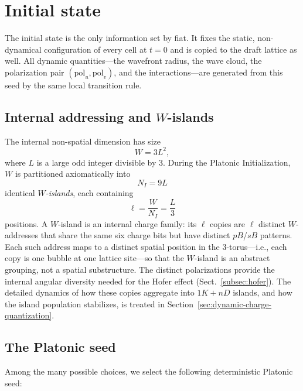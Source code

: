 \documentclass{ijuc}
\begin{document}

\section{Initial state}\label{initial-state}

The initial state is the only information set by fiat.  It fixes the static, non-dynamical configuration of every cell at $t=0$ and is copied to the draft lattice as well.  All dynamic quantities---the wavefront radius, the wave cloud, the polarization pair $(\mathrm{pol}_u,\mathrm{pol}_v)$, and the interactions---are generated from this seed by the same local transition rule.

\subsection{Internal addressing and $W$-islands}\label{subsec:w-islands}

The internal non-spatial dimension has size
\begin{equation}
W=3L^{2},
\end{equation}
where $L$ is a large odd integer divisible by $3$.
During the Platonic Initialization, $W$ is partitioned axiomatically into
\begin{equation}
N_{I}=9L
\end{equation}
identical \emph{$W$-islands}, each containing
\begin{equation}
\ell=\frac{W}{N_{I}}=\frac{L}{3}
\end{equation}
positions.
A $W$-island is an internal charge family: its $\ell$ copies are $\ell$ distinct $W$-addresses that share the same six charge bits but have distinct $pB$/$sB$ patterns.  Each such address maps to a distinct spatial position in the 3-torus---i.e., each copy is one bubble at one lattice site---so that the $W$-island is an abstract grouping, not a spatial substructure.
The distinct polarizations provide the internal angular diversity needed for the Hofer effect (Sect.~\ref{subsec:hofer}).
The detailed dynamics of how these copies aggregate into $1K+nD$ islands, and how the island population stabilizes, is treated in Section~\ref{sec:dynamic-charge-quantization}.

\subsection{The Platonic seed}

Among the many possible choices, we select the following deterministic Platonic seed:
\end{document}
